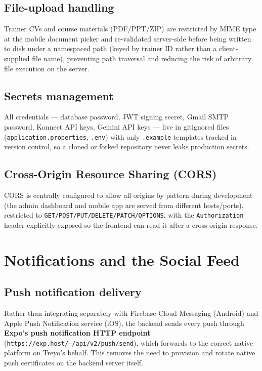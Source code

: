 \documentclass[a4paper,12pt]{report}
\begin{document}
\section{File-upload handling}
Trainer CVs and course materials (PDF/PPT/ZIP) are restricted by MIME type
at the mobile document picker and re-validated server-side before being
written to disk under a namespaced path (keyed by trainer ID rather than a
client-supplied file name), preventing path traversal and reducing the
risk of arbitrary file execution on the server.

\section{Secrets management}
All credentials --- database password, JWT signing secret, Gmail SMTP
password, Konnect API keys, Gemini API keys --- live in gitignored files
(\texttt{application.properties}, \texttt{.env}) with only \texttt{.example}
templates tracked in version control, so a cloned or forked repository
never leaks production secrets.

\section{Cross-Origin Resource Sharing (CORS)}
CORS is centrally configured to allow all origins by pattern during
development (the admin dashboard and mobile app are served from different
hosts/ports), restricted to \texttt{GET/POST/PUT/DELETE/PATCH/OPTIONS},
with the \texttt{Authorization} header explicitly exposed so the frontend
can read it after a cross-origin response.

\chapter{Notifications and the Social Feed}
\label{chap:notif-feed}

\section{Push notification delivery}
Rather than integrating separately with Firebase Cloud Messaging (Android)
and Apple Push Notification service (iOS), the backend sends every push
through \textbf{Expo's push notification HTTP endpoint}
(\texttt{https://exp.host/--/api/v2/push/send}), which forwards to the
correct native platform on Treyo's behalf. This removes the need to
provision and rotate native push certificates on the backend server
itself.
\end{document}
